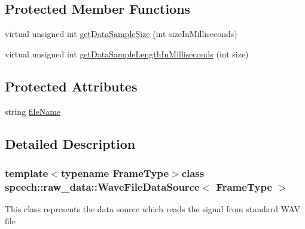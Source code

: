 \subsection*{Protected Member Functions}
\begin{DoxyCompactItemize}
\item 
virtual unsigned int \hyperlink{classspeech_1_1raw__data_1_1WaveFileDataSource_ac88d8d6a4d6c1f5cf9031fc4d3153542}{get\+Data\+Sample\+Size} (int size\+In\+Milliseconds)
\item 
virtual unsigned int \hyperlink{classspeech_1_1raw__data_1_1WaveFileDataSource_a62bdc52d91ffeb282da46d42ad3d230c}{get\+Data\+Sample\+Length\+In\+Milliseconds} (int size)
\end{DoxyCompactItemize}
\subsection*{Protected Attributes}
\begin{DoxyCompactItemize}
\item 
string \hyperlink{classspeech_1_1raw__data_1_1WaveFileDataSource_a28870da18426c9339b8f67eec21000be}{file\+Name}
\end{DoxyCompactItemize}


\subsection{Detailed Description}
\subsubsection*{template$<$typename Frame\+Type$>$class speech\+::raw\+\_\+data\+::\+Wave\+File\+Data\+Source$<$ Frame\+Type $>$}

This class represents the data source which reads the signal from standard W\+A\+V file 

